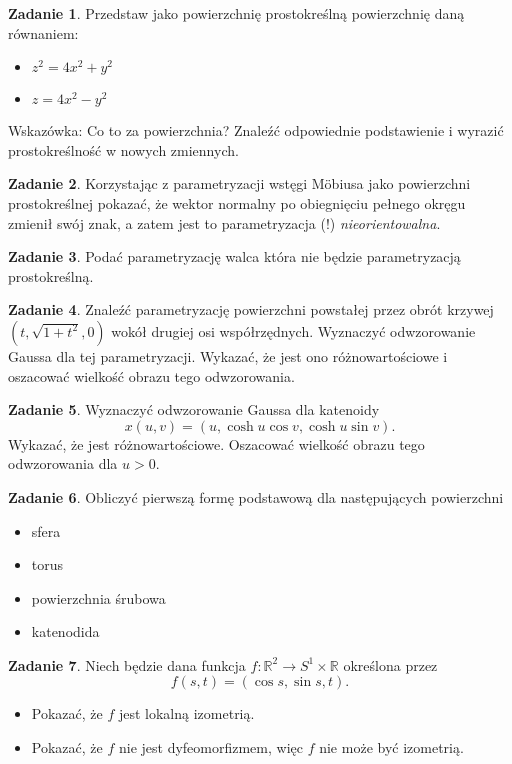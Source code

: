 \documentclass[a4paper,11pt]{article}
\theoremstyle{definition}\newtheorem{exercise}{Zadanie}
\theoremstyle{definition}\newtheorem{remark}{Uwaga}
\begin{document}
\begin{exercise}
Przedstaw jako powierzchnię prostokreślną powierzchnię daną równaniem: 

\begin{itemize}
 \item $z^2=4x^2+y^2$
 \item $z=4x^2-y^2$
\end{itemize}
 \small{Wskazówka: Co to za powierzchnia? Znaleźć 
odpowiednie podstawienie i wyrazić prostokreślność w nowych zmiennych.}
\end{exercise}


\begin{exercise}
Korzystając z parametryzacji wstęgi M\"obiusa jako powierzchni prostokreślnej 
pokazać, że wektor normalny po obiegnięciu pełnego okręgu zmienił sw\'oj znak, a 
zatem jest to parametryzacja (!) \textit{nieorientowalna}.
\end{exercise}

\begin{exercise}
Podać parametryzację walca która nie będzie parametryzacją prostokreślną.
\end{exercise}


\begin{exercise}
Znaleźć parametryzację powierzchni powstałej przez obrót krzywej 
$(t,\sqrt{1+t^{2}},0)$ wokół drugiej osi współrzędnych. Wyznaczyć odwzorowanie 
Gaussa dla tej parametryzacji. Wykazać, że jest ono różnowartościowe i 
oszacować wielkość obrazu tego odwzorowania.
\end{exercise}


\begin{exercise}
Wyznaczyć odwzorowanie Gaussa dla katenoidy 
\[x(u,v)=(u,\cosh{u}\cos{v},\cosh{u}\sin{v}).\]
Wykazać, że jest różnowartościowe. Oszacować wielkość obrazu tego odwzorowania 
dla $u>0$.
\end{exercise}


\begin{exercise}
 Obliczyć pierwszą formę podstawową dla następujących powierzchni
 \begin{itemize}
  \item sfera
 \item torus
\item powierzchnia śrubowa
\item katenodida
 \end{itemize}

 \end{exercise}
 
 \begin{exercise}
Niech będzie dana funkcja $f\colon \mathbb{R}^2 \to S^1 \times \mathbb{R}$ 
określona przez \[f(s,t)=(\cos s, \sin s, t).\]
\begin{itemize}
 \item Pokazać, że $f$ jest lokalną izometrią.
 \item Pokazać, że $f$ nie jest dyfeomorfizmem, więc $f$ nie może być izometrią.
\end{itemize}
 
\end{exercise}
 
\end{document}
